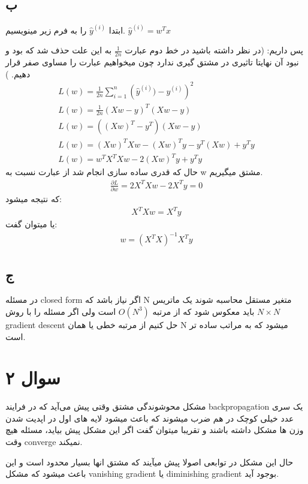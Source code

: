 \documentclass{article}[12pt]
\begin{document}
\subsection{ب}

ابتدا 
$\hat{y}^{(i)}$
را به فرم زیر مینویسیم.
$\hat{y}^{(i)}=w^{T} x$

پس داریم: (در نظر داشته باشید در خط دوم عبارت 
$\frac{1}{2n}$
به این علت حذف شد که بود و نبود آن نهایتا تاثیری در مشتق گیری ندارد چون میخواهیم عبارت را مساوی صفر قرار دهیم. 
)
	\begin{gather*}
	L\left(w\right)=\frac{1}{2 n} \sum_{i=1}^{n}\left(\hat{y}^{(i)})-y^{(i)}\right)^{2} 
	\\
	L(w)=\frac{1}{2 n}(X w-y)^{T}(X w-y) \\ 
	L(w)=\left((X w)^{T}-y^{T}\right)(X w-y) \\
	L(w)=(X w)^{T} X w-(X w)^{T} y-y^{T}(X w)+y^{T} y\\
	L(w)=w^{T} X^{T} X w-2(X w)^{T} y+y^{T} y
	\end{gather*}
حال که قدری ساده سازی انجام شد از عبارت نسبت به w مشتق میگیریم. 
\begin{gather*}
	\frac{\partial L}{\partial w}=2 X^{T} X w-2 X^{T} y=0	
\end{gather*}
که نتیجه میشود:
\begin{gather*}
	X^{T} X w=X^{T} y
\end{gather*}
یا میتوان گفت:
\begin{gather*}
	w=\left(X^{T} X\right)^{-1} X^{T} y
\end{gather*}

\subsection{ج}

در مسئله closed form اگر نیاز باشد که N متغیر مستقل محاسبه شوند یک ماتریس 
$N \times N$
باید معکوس شود که از مرتبه 
$O(N^3)$
است ولی اگر مسئله را با روش gradient descent حل کنیم از مرتبه خطی یا همان N میشود که به مراتب ساده تر است. 


\section{سوال ۲}
مشکل محوشوندگی مشتق وقتی پیش می‌آید که در فرایند backpropagation یک سری عدد خیلی کوچک در هم ضرب میشوند که باعث میشود لایه های اول در اپدیت شدن وزن ها مشکل داشته باشند و تقریبا میتوان گفت اگر این مشکل پیش بیاید، مسئله هیچ وقت converge نمیکند. 

حال این مشکل در توابعی اصولا پیش میآیند که مشتق انها بسیار محدود است  و این باعث میشود که مشکل vanishing gradient یا diminishing gradient بوجود آید. 
\end{document}

